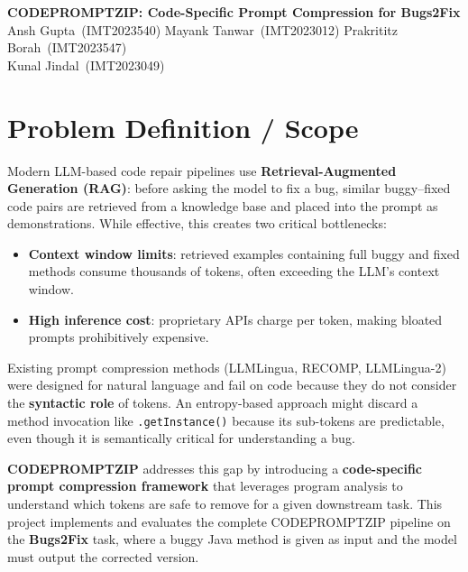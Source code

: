 \documentclass[11pt,a4paper]{article}
\begin{document}
\begin{center}
  {\LARGE\bfseries CODEPROMPTZIP: Code-Specific Prompt Compression for Bugs2Fix}\\[0.7em]
  {\normalsize
    Ansh Gupta~(IMT2023540)\quad
    Mayank Tanwar~(IMT2023012)\quad
    Prakrititz Borah~(IMT2023547)\\
    Kunal Jindal~(IMT2023049)
  }
\end{center}

\section{Problem Definition / Scope}

Modern LLM-based code repair pipelines use \textbf{Retrieval-Augmented Generation (RAG)}: before asking the model to fix a bug, similar buggy--fixed code pairs are retrieved from a knowledge base and placed into the prompt as demonstrations. While effective, this creates two critical bottlenecks:

\begin{itemize}[leftmargin=1.5em]
  \item \textbf{Context window limits}: retrieved examples containing full buggy and fixed methods consume thousands of tokens, often exceeding the LLM's context window.
  \item \textbf{High inference cost}: proprietary APIs charge per token, making bloated prompts prohibitively expensive.
\end{itemize}

Existing prompt compression methods (LLMLingua, RECOMP, LLMLingua-2) were designed for natural language and fail on code because they do not consider the \textbf{syntactic role} of tokens. An entropy-based approach might discard a method invocation like \texttt{.getInstance()} because its sub-tokens are predictable, even though it is semantically critical for understanding a bug.

\textbf{CODEPROMPTZIP} addresses this gap by introducing a \textbf{code-specific prompt compression framework} that leverages program analysis to understand which tokens are safe to remove for a given downstream task. This project implements and evaluates the complete CODEPROMPTZIP pipeline on the \textbf{Bugs2Fix} task, where a buggy Java method is given as input and the model must output the corrected version.
\end{document}

